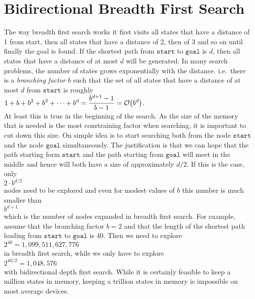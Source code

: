 \section{Bidirectional Breadth First Search}
The way breadth first search works it first visits all states that have a distance of 1 from start, then all
states that have a distance of 2, then of 3 and so on until finally the goal is found.  If the shortest path
from $\mathtt{start}$ to $\mathtt{goal}$ is $d$, then all states that have a distance of at most $d$ will be
generated.  In many search problems, the number of states grows exponentially with the distance. i.e.~there is
a \emph{\color{blue}branching factor} $b$ such that the set of all states that have a distance of at most $d$
from $\mathtt{start}$ is roughly
\\[0.2cm]
\hspace*{1.3cm}
 $\displaystyle 1 + b + b^2 + b^3 + \cdots + b^d = \frac{b^{d+1} - 1}{b - 1} = \mathcal{O}\bigl(b^d\bigr)$. 
\\[0.2cm]
At least this is true in the beginning of the search.  As the size of
the memory that is needed is the most constraining factor when searching, it is important to cut down this
size.  On simple idea is to start searching both from the node $\mathtt{start}$ and the node $\mathtt{goal}$
simultaneously.  The justification is that we can hope that the path starting form $\mathtt{start}$ and the
path starting from $\mathtt{goal}$ will meet in the middle and hence will both have a size of approximately
$d/2$.  If this is the case, only
\\[0.2cm]
\hspace*{1.3cm}
$2 \cdot b^{d/2}$ 
\\[0.2cm]
nodes need to be explored and even for modest values of $b$ this number is much smaller than 
\\[0.2cm]
\hspace*{1.3cm}
$b^{d+1}$
\\[0.2cm]
which is the number of nodes expanded in breadth first search.  For example, assume that the branching factor
$b = 2$ and that the length of the shortest path leading from $\mathtt{start}$ to $\mathtt{goal}$
is $40$.  Then we need to explore
\\[0.2cm]
\hspace*{1.3cm}
$2^{40} = 1,099,511,627,776$
\\[0.2cm]
in breadth first search, while we only have to explore 
\\[0.2cm]
\hspace*{1.3cm}
$2^{40/2} = 1,048,576$
\\[0.2cm]
with bidirectional depth first search.  While it is certainly feasible to keep a million states in memory,
keeping a trillion states in memory is impossible on most average devices.


